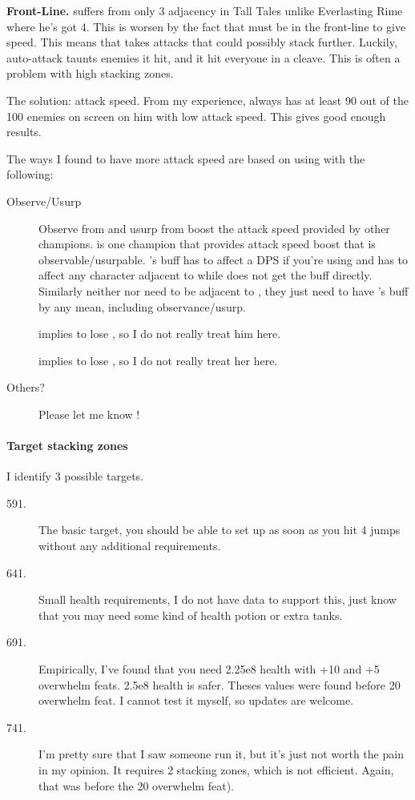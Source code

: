 \documentclass{article}
\begin{document}
\textbf{\hewmaan Front-Line.}
\hewmaan suffers from only 3 adjacency in Tall Tales unlike Everlasting Rime where he's got 4.
This is worsen by the fact that \hewmaan must be in the front-line to give speed.
This means that \hewmaan takes attacks that could possibly stack \briv further.
Luckily, \briv auto-attack taunts enemies it hit, and it hit everyone in a cleave.
This is often a problem with high stacking zones.

The solution: attack speed.
From my experience, \briv always has at least 90 out of the 100 enemies on screen on him with low attack speed.
This gives good enough results.

The ways I found to have more attack speed are based on using \widdle with the following:
\begin{description}
    \item[Observe/Usurp] Observe from \artemis and usurp from \arkhan boost the attack speed provided by other champions.
    \hewmaan is one champion that provides attack speed boost that is observable/usurpable.
    \hewmaan's buff has to affect a DPS if you're using \artemis and has to affect any character adjacent to \arkhan while \arkhan does not get the buff directly.
    Similarly neither \artemis nor \arkhan need to be adjacent to \widdle, they just need to have \widdle's buff by any mean, including observance/usurp.
    
    \item[\nrakk] \nrakk implies to lose \hewmaan, so I do not really treat him here.
    
    \item[\alyndra] \alyndra implies to lose \shandie, so I do not really treat her here.
    
    \item[Others?] Please let me know !
\end{description}


\paragraph{Target stacking zones}

I identify 3 possible targets.
\begin{description}
    \item[591.] The basic target, you should be able to set up as soon as you hit 4 jumps without any additional requirements.
    \item[641.] Small health requirements, I do not have data to support this, just know that you may need some kind of health potion or extra tanks.
    \item[691.] Empirically, I've found that you need 2.25e8 health with +10 and +5 overwhelm feats.
    2.5e8 health is safer.
    Theses values were found before 20 overwhelm feat.
    I cannot test it myself, so updates are welcome.
    \item[741.] I'm pretty sure that I saw someone run it, but it's just not worth the pain in my opinion.
    It requires 2 stacking zones, which is not efficient.
    Again, that was before the 20 overwhelm feat).
\end{description}
\end{document}
